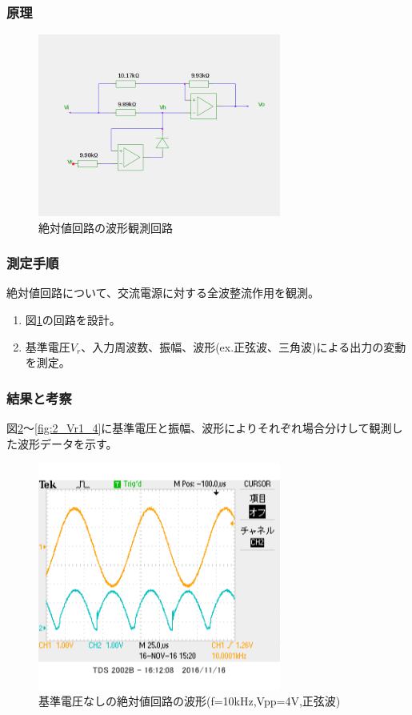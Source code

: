 \documentclass[11pt,a4j]{jsarticle}
\begin{document}
   \subsubsection{原理}
    
    \begin{figure}[htbp]
  \centering
  \includegraphics[width=8cm,clip]{abs_wave.png}
  \caption{絶対値回路の波形観測回路}
  \label{fig:abs_wave}
 \end{figure}%
    
   \subsubsection{測定手順}
    絶対値回路について、交流電源に対する全波整流作用を観測。
    \begin{enumerate}
    \item 図\ref{fig:abs_wave}の回路を設計。
    \item 基準電圧$V_r$、入力周波数、振幅、波形(ex.正弦波、三角波)による出力の変動を測定。
    \end{enumerate}
    
   \subsubsection{結果と考察}
    
    図\ref{fig:2_Vr0_sin}～\ref{fig:2_Vr1_4}に基準電圧と振幅、波形によりそれぞれ場合分けして観測した波形データを示す。
    
    \begin{figure}[htbp]
  \centering
  \includegraphics[width=8cm,clip]{2_abs_Vr0_f10V4sin_ViVo.png}
  \caption{基準電圧なしの絶対値回路の波形(f=10kHz,Vpp=4V,正弦波)}
  \label{fig:2_Vr0_sin}
 \end{figure}%
    
\end{document}
